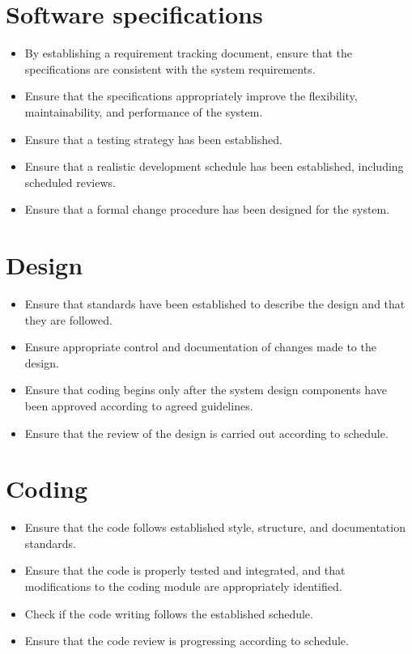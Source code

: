\documentclass{article}
\begin{document}
\section{Software specifications}
\begin{itemize}
\item By establishing a requirement tracking document, ensure that the specifications are consistent with the system requirements.
\item Ensure that the specifications appropriately improve the flexibility, maintainability, and performance of the system.
\item Ensure that a testing strategy has been established.
\item Ensure that a realistic development schedule has been established, including scheduled reviews.
\item Ensure that a formal change procedure has been designed for the system.
\end{itemize}
\section{Design}
\begin{itemize}
\item Ensure that standards have been established to describe the design and that they are followed.
\item Ensure appropriate control and documentation of changes made to the design.
\item Ensure that coding begins only after the system design components have been approved according to agreed guidelines.
\item Ensure that the review of the design is carried out according to schedule.
\end{itemize}
\section{Coding}
\begin{itemize}
\item Ensure that the code follows established style, structure, and documentation standards.
\item Ensure that the code is properly tested and integrated, and that modifications to the coding module are appropriately identified.
\item Check if the code writing follows the established schedule.
\item Ensure that the code review is progressing according to schedule.
\end{itemize}
\end{document}
